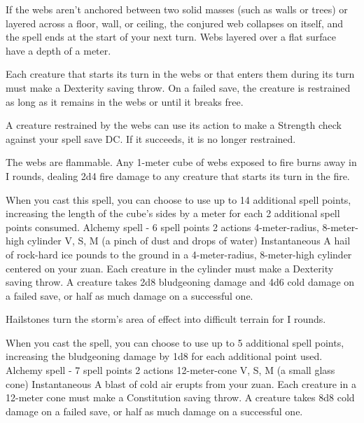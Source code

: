         If the webs aren't anchored between two solid masses (such as walls or trees) or layered across a floor, wall, or ceiling, the conjured web collapses on itself, and the spell ends at the start of your next turn.
        Webs layered over a flat surface have a depth of a meter.

        Each creature that starts its turn in the webs or that enters them during its turn must make a Dexterity saving throw.
        On a failed save, the creature is restrained as long as it remains in the webs or until it breaks free.

        A creature restrained by the webs can use its action to make a Strength check against your spell save DC.
        If it succeeds, it is no longer restrained.

        The webs are flammable.
        Any 1-meter cube of webs exposed to fire burns away in I rounds, dealing 2d4 fire damage to any creature that starts its turn in the fire.

        When you cast this spell, you can choose to use up to 14 additional spell points, increasing the length of the cube's sides by a meter for each 2 additional spell points consumed.
        {Alchemy spell - 6 spell points}
        {2 actions}
        {4-meter-radius, 8-meter-high cylinder}
        {V, S, M (a pinch of dust and drops of water)}
        {Instantaneous}
        A hail of rock-hard ice pounds to the ground in a 4-meter-radius, 8-meter-high cylinder centered on your zuan.
        Each creature in the cylinder must make a Dexterity saving throw.
        A creature takes 2d8 bludgeoning damage and 4d6 cold damage on a failed save, or half as much damage on a successful one.

        Hailstones turn the storm's area of effect into difficult terrain for I rounds.

        When you cast the spell, you can choose to use up to 5 additional spell points, increasing the bludgeoning damage by 1d8 for each additional point used.
        {Alchemy spell - 7 spell points}
        {2 actions}
        {12-meter-cone}
        {V, S, M (a small glass cone)}
        {Instantaneous}
        A blast of cold air erupts from your zuan.
        Each creature in a 12-meter cone must make a Constitution saving throw.
        A creature takes 8d8 cold damage on a failed save, or half as much damage on a successful one.


